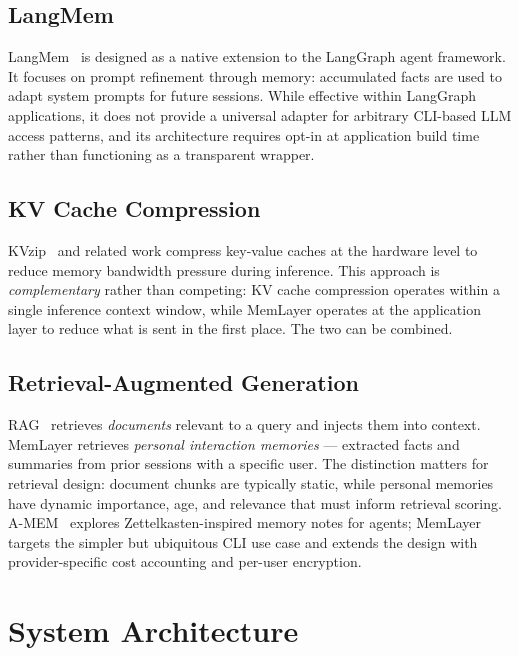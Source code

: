\documentclass[10pt,twocolumn]{article}
\begin{document}
\subsection{LangMem}

\noindent
LangMem~\citep{chase2024langmem} is designed as a native extension to the
LangGraph agent framework. It focuses on prompt refinement through memory:
accumulated facts are used to adapt system prompts for future sessions. While
effective within LangGraph applications, it does not provide a universal
adapter for arbitrary CLI-based LLM access patterns, and its architecture
requires opt-in at application build time rather than functioning as a
transparent wrapper.

\subsection{KV Cache Compression}

\noindent
KVzip~\citep{he2025kvzip} and related work compress key-value caches at the
hardware level to reduce memory bandwidth pressure during inference. This
approach is \emph{complementary} rather than competing: KV cache compression
operates within a single inference context window, while MemLayer operates at
the application layer to reduce what is sent in the first place. The two
can be combined.

\subsection{Retrieval-Augmented Generation}

\noindent
RAG~\citep{lewis2020retrieval} retrieves \emph{documents} relevant to a query
and injects them into context. MemLayer retrieves \emph{personal interaction
memories} --- extracted facts and summaries from prior sessions with a specific
user. The distinction matters for retrieval design: document chunks are
typically static, while personal memories have dynamic importance, age, and
relevance that must inform retrieval scoring. A-MEM~\citep{xu2025amem} explores
Zettelkasten-inspired memory notes for agents; MemLayer targets the simpler but
ubiquitous CLI use case and extends the design with provider-specific cost
accounting and per-user encryption.

\section{System Architecture}
\label{sec:architecture}
\end{document}
